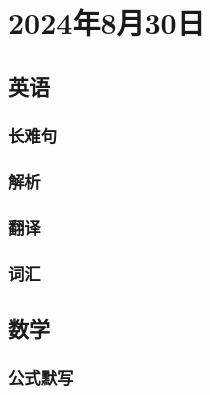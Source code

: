 \documentclass[UTF8]{ctexart}
\begin{document}
\section{2024年8月30日}
\subsection{英语}
\subsubsection{长难句}
\subsubsection{解析}
\subsubsection{翻译}
\subsubsection{词汇}
\subsection{数学}
\subsubsection{公式默写}
\begin{multicols}{2}
\end{multicols}
\end{document}
